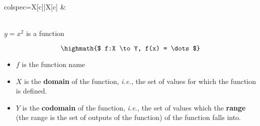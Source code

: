 \documentclass[12pt,a4paper,titlepage]{article}
\begin{document}
\begin{SummaryBox}[title=Functions VS relations]
\begin{SummaryExtensionBox}[title=Vertical line test, center lower]
\begin{tblr}{colspec={X[c]|X[c]}}
                        &
                        
                        {\\
                        $y=x^2$ is a function}
                    \end{tblr}
                \end{SummaryExtensionBox}
            \end{SummaryBox}
            
            \begin{SummaryBox}[title=Function notation]
                \[ \highmath{$ f:X \to Y, f(x) = \dots $} \]
                \begin{itemize}[leftmargin=*]
                    \item $f$ is the function name
                    \item $X$ is the \textbf{domain} of the function, \textit{i.e.,} the set of values for which the function is defined.
                    \item $Y$ is the \textbf{codomain} of the function, \textit{i.e.,} the set of values which the \textbf{range} (the range is the set of outputs of the function) of the function falls into.
                \end{itemize}
            \end{SummaryBox}
            
\end{document}
